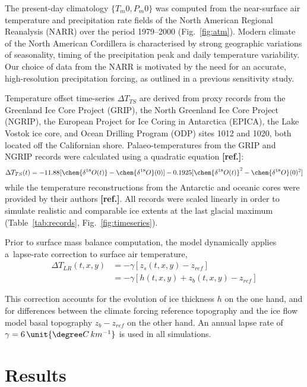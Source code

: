 \documentclass[tc, ms]{copernicus}
\newcommand{\aref}[0]{\textbf{[ref.]}}
\begin{document}
The present-day climatology $\{T_m0, P_m0\}$ was computed from the near-surface air temperature and
precipitation rate fields of the North American Regional Reanalysis (NARR) over
the period 1979--2000 (Fig.~\ref{fig:atm}). Modern climate of the North
American Cordillera is characterised by strong geographic variations of
seasonality, timing of the precipitation peak and daily temperature variability.
Our choice of data from the NARR is motivated by the need for an accurate,
high-resolution precipitation forcing, as outlined in a previous sensitivity
study.

Temperature offset time-series ${\Delta}T_{TS}$ are derived from proxy records from
the Greenland Ice Core Project (GRIP), the North Greenland Ice Core Project
(NGRIP), the European Project for Ice Coring in Antarctica (EPICA), the Lake
Vostok ice core, and Ocean Drilling Program (ODP) sites 1012 and 1020, both
located off the Californian shore. Palaeo-temperatures from the GRIP and NGRIP
records were calculated using a quadratic equation \aref:
\begin{equation}
    {\Delta}T_{TS}(t) = -11.88[\chem{\delta^{18}O(t)}-\chem{\delta^{18}O}(0)]
                        -0.1925[\chem{\delta^{18}O(t)}^2-\chem{\delta^{18}O}(0)^2]
\end{equation}
while the temperature reconstructions from the Antarctic and oceanic cores were
provided by their authors \aref. All records were scaled linearly in
order to simulate realistic and comparable ice extents at the last
glacial maximum (Table~\ref{tab:records}, Fig.~\ref{fig:timeseries}).

Prior to surface mass balance computation, the model dynamically applies
a~lapse-rate correction to surface air temperature,
\begin{align}
    {\Delta}T_{LR}(t, x, y) &= -\gamma [z_{s}(t, x, y)-z_{ref}] \\
                            &= -\gamma [h(t, x, y)+z_{b}(t, x, y)-z_{ref}]
\end{align}

This correction accounts for the evolution of ice thickness $h$ on the one
hand, and for differences between the climate forcing reference topography and
the ice flow model basal topography $z_{b}-z_{ref}$ on the other hand. An
annual lapse rate of $\gamma = 6\,\unit{{\degree}C\,km^{-1}}$ is used in all
simulations.


\section{Results}
\label{sec:results}
\end{document}
